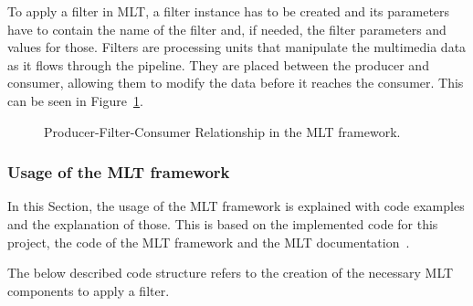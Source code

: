\documentclass[../MasterThesis.tex]{subfiles}
\begin{document}
To apply a filter in MLT, a filter instance has to be created and its parameters have to contain the name of the filter and, if needed, the filter parameters and values for those.
Filters are processing units that manipulate the multimedia data as it flows through the pipeline. They are placed between the producer and consumer, allowing them to modify the data before it reaches the consumer. This can be seen in Figure~\ref{fig:producer_filter_consumer}.



\begin{figure}[H]
	\centering
	\caption{Producer-Filter-Consumer Relationship in the MLT framework.}
	\label{fig:producer_filter_consumer}
\end{figure}



\subsubsection*{Usage of the MLT framework}


In this Section, the usage of the MLT framework is explained with code examples and the explanation of those. This is based on the implemented code for this project, the code of the MLT framework and the MLT documentation~\cite{melt}.

The below described code structure refers to the creation of the necessary MLT components to apply a filter.
\end{document}
